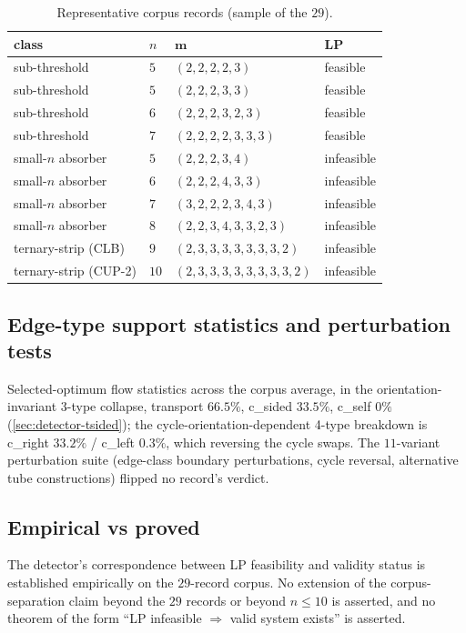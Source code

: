 \documentclass[11pt,a4paper]{article}
\theoremstyle{plain}
\theoremstyle{definition}
\begin{document}
\begin{table}[ht]
\centering
\small
\caption{Representative corpus records (sample of the $29$).}\label{tab:corpus-sample}
\begin{tabular}{l l l l}
\toprule
class & $n$ & $\mathbf{m}$ & LP\\\midrule
sub-threshold       & $5$ & $(2, 2, 2, 2, 3)$ & feasible\\
sub-threshold       & $5$ & $(2, 2, 2, 3, 3)$ & feasible\\
sub-threshold       & $6$ & $(2, 2, 2, 3, 2, 3)$ & feasible\\
sub-threshold       & $7$ & $(2, 2, 2, 2, 3, 3, 3)$ & feasible\\
small-$n$ absorber  & $5$ & $(2, 2, 2, 3, 4)$ & infeasible\\
small-$n$ absorber  & $6$ & $(2, 2, 2, 4, 3, 3)$ & infeasible\\
small-$n$ absorber  & $7$ & $(3, 2, 2, 2, 3, 4, 3)$ & infeasible\\
small-$n$ absorber  & $8$ & $(2, 2, 3, 4, 3, 3, 2, 3)$ & infeasible\\
ternary-strip (CLB) & $9$ & $(2, 3, 3, 3, 3, 3, 3, 3, 2)$ & infeasible\\
ternary-strip (CUP-2) & $10$ & $(2, 3, 3, 3, 3, 3, 3, 3, 3, 2)$ & infeasible\\
\bottomrule
\end{tabular}
\end{table}

\subsection{Edge-type support statistics and perturbation tests}\label{app:detector-stats}

Selected-optimum flow statistics across the corpus average, in the
orientation-invariant 3-type collapse, transport $66.5\%$, c\_sided
$33.5\%$, c\_self $0\%$ (\cref{sec:detector-tsided}); the
cycle-orientation-dependent 4-type breakdown is c\_right $33.2\%$ /
c\_left $0.3\%$, which reversing the cycle swaps.  The $11$-variant
perturbation suite (edge-class boundary perturbations, cycle
reversal, alternative tube constructions) flipped no record's
verdict.

\subsection{Empirical vs proved}\label{app:detector-status}

The detector's correspondence between LP feasibility and validity
status is established empirically on the $29$-record corpus.  No
extension of the corpus-separation claim beyond the $29$ records or
beyond $n \le 10$ is asserted, and no theorem of the form ``LP
infeasible $\Rightarrow$ valid system exists'' is asserted.
\end{document}
